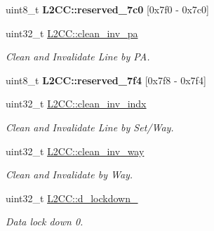 \begin{DoxyCompactItemize}
\mbox{\label{group__L2C-310__cache_gab25f0643e296807d5ecdcacad0265ca4}} 
uint8\+\_\+t {\bfseries L2\+C\+C\+::reserved\+\_\+7c0} \mbox{[}0x7f0 -\/ 0x7c0\mbox{]}
\item 
\mbox{\label{group__L2C-310__cache_ga82e830a23bbe0454ede493b04dc55499}} 
uint32\+\_\+t \mbox{\hyperlink{group__L2C-310__cache_ga82e830a23bbe0454ede493b04dc55499}{L2\+C\+C\+::clean\+\_\+inv\+\_\+pa}}
\begin{DoxyCompactList}\small\item\em Clean and Invalidate Line by PA. \end{DoxyCompactList}\item 
\mbox{\label{group__L2C-310__cache_ga4210e95808aa3477b79bdc783730f028}} 
uint8\+\_\+t {\bfseries L2\+C\+C\+::reserved\+\_\+7f4} \mbox{[}0x7f8 -\/ 0x7f4\mbox{]}
\item 
\mbox{\label{group__L2C-310__cache_gaae790cb415296d7967a209a51e4c1112}} 
uint32\+\_\+t \mbox{\hyperlink{group__L2C-310__cache_gaae790cb415296d7967a209a51e4c1112}{L2\+C\+C\+::clean\+\_\+inv\+\_\+indx}}
\begin{DoxyCompactList}\small\item\em Clean and Invalidate Line by Set/\+Way. \end{DoxyCompactList}\item 
\mbox{\label{group__L2C-310__cache_ga8ac32cdc984ec4cb4a39af324fceb45b}} 
uint32\+\_\+t \mbox{\hyperlink{group__L2C-310__cache_ga8ac32cdc984ec4cb4a39af324fceb45b}{L2\+C\+C\+::clean\+\_\+inv\+\_\+way}}
\begin{DoxyCompactList}\small\item\em Clean and Invalidate by Way. \end{DoxyCompactList}\item 
\mbox{\label{group__L2C-310__cache_gaf81d78e32e50e190e09fd68a81d94534}} 
uint32\+\_\+t \mbox{\hyperlink{group__L2C-310__cache_gaf81d78e32e50e190e09fd68a81d94534}{L2\+C\+C\+::d\+\_\+lockdown\+\_}}
\begin{DoxyCompactList}\small\item\em Data lock down 0. \end{DoxyCompactList}\item 

\end{DoxyCompactItemize}
